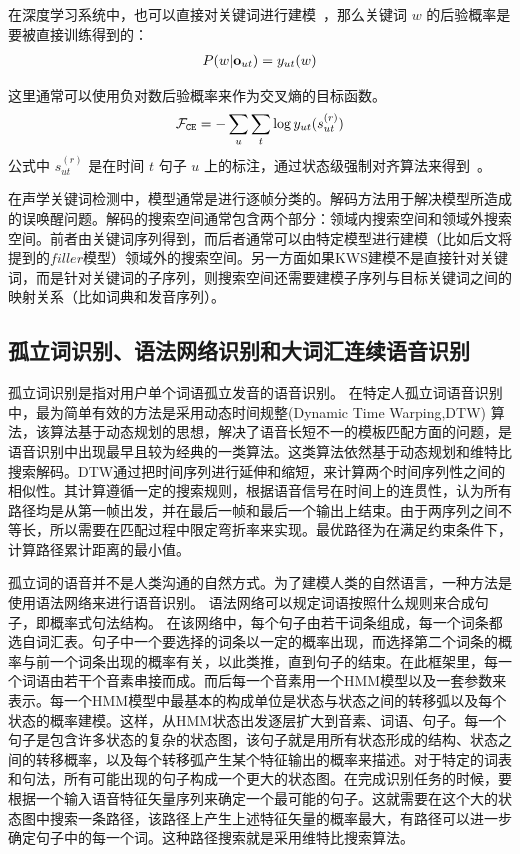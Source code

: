 在深度学习系统中，也可以直接对关键词进行建模~\cite{chen2014small}，那么关键词 $w$ 的后验概率是要被直接训练得到的：
\begin{equation}
\label{equ:dnn-kw-define}
\begin{split}
P(w|{\bf o}_{ut})= y_{ut}(w)
\end{split}
\end{equation}

这里通常可以使用负对数后验概率来作为交叉熵的目标函数。
\begin{equation}
\label{equ:dnn-hmm-ce}
\begin{split}
\mathcal{F}_{\tt{CE}}=- \sum_{u} \sum_{t} \log y_{ut}(s^{(r)}_{ut})
\end{split}
\end{equation}
公式中 $s^{(r)}_{ut}$ 是在时间 $t$ 句子 $u$ 上的标注，通过状态级强制对齐算法来得到~\cite{woodland1994large}。


在声学关键词检测中，模型通常是进行逐帧分类的。解码方法用于解决模型所造成的误唤醒问题。解码的搜索空间通常包含两个部分：领域内搜索空间和领域外搜索空间。前者由关键词序列得到，而后者通常可以由特定模型进行建模（比如后文将提到的$filler$模型）领域外的搜索空间。另一方面如果KWS建模不是直接针对关键词，而是针对关键词的子序列，则搜索空间还需要建模子序列与目标关键词之间的映射关系（比如词典和发音序列）。

\subsection{孤立词识别、语法网络识别和大词汇连续语音识别}
\label{chap:intro-lvcsr}


孤立词识别是指对用户单个词语孤立发音的语音识别。
在特定人孤立词语音识别中，最为简单有效的方法是采用动态时间规整(Dynamic Time Warping,DTW) 算法，该算法基于动态规划的思想，解决了语音长短不一的模板匹配方面的问题，是语音识别中出现最早且较为经典的一类算法。这类算法依然基于动态规划和维特比搜索解码。DTW通过把时间序列进行延伸和缩短，来计算两个时间序列性之间的相似性。其计算遵循一定的搜索规则，根据语音信号在时间上的连贯性，认为所有路径均是从第一帧出发，并在最后一帧和最后一个输出上结束。由于两序列之间不等长，所以需要在匹配过程中限定弯折率来实现。最优路径为在满足约束条件下，计算路径累计距离的最小值。

孤立词的语音并不是人类沟通的自然方式。为了建模人类的自然语言，一种方法是使用语法网络来进行语音识别。
语法网络可以规定词语按照什么规则来合成句子，即概率式句法结构。
在该网络中，每个句子由若干词条组成，每一个词条都选自词汇表。句子中一个要选择的词条以一定的概率出现，而选择第二个词条的概率与前一个词条出现的概率有关，以此类推，直到句子的结束。在此框架里，每一个词语由若干个音素串接而成。而后每一个音素用一个HMM模型以及一套参数来表示。每一个HMM模型中最基本的构成单位是状态与状态之间的转移弧以及每个状态的概率建模。这样，从HMM状态出发逐层扩大到音素、词语、句子。每一个句子是包含许多状态的复杂的状态图，该句子就是用所有状态形成的结构、状态之间的转移概率，以及每个转移弧产生某个特征输出的概率来描述。对于特定的词表和句法，所有可能出现的句子构成一个更大的状态图。在完成识别任务的时候，要根据一个输入语音特征矢量序列来确定一个最可能的句子。这就需要在这个大的状态图中搜索一条路径，该路径上产生上述特征矢量的概率最大，有路径可以进一步确定句子中的每一个词。这种路径搜索就是采用维特比搜索算法。

